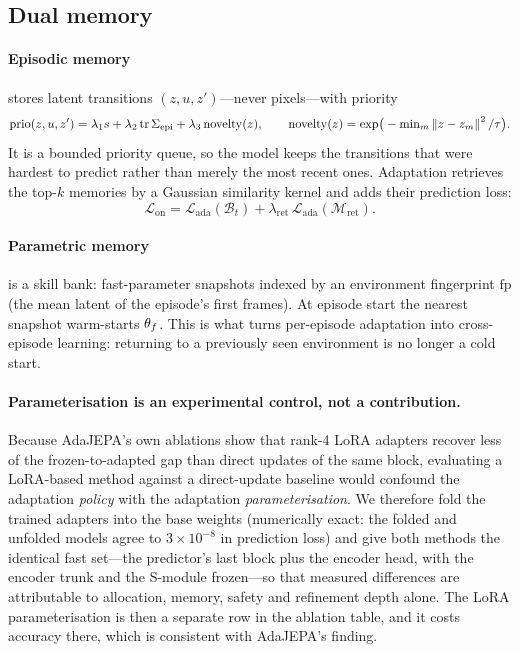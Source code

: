 \subsection{Dual memory}\label{sec:mem}

\paragraph{Episodic memory} stores latent transitions $(z,u,z')$---never pixels---with
priority
\begin{equation}
\mathrm{prio}(z,u,z') = \lambda_1 s + \lambda_2\,\mathrm{tr}\,\Sigma_{\mathrm{epi}}
+ \lambda_3\,\mathrm{novelty}(z),\qquad
\mathrm{novelty}(z)=\exp\!\big(-{\textstyle\min_m}\left\lVert z-z_m \right\rVert^2/\tau\big).
\end{equation}
It is a bounded priority queue, so the model keeps the transitions that were hardest to
predict rather than merely the most recent ones. Adaptation retrieves the top-$k$ memories by
a Gaussian similarity kernel and adds their prediction loss:
\begin{equation}
\mathcal L_{\mathrm{on}} = \mathcal L_{\mathrm{ada}}(\mathcal B_t)
+ \lambda_{\mathrm{ret}}\,\mathcal L_{\mathrm{ada}}(\mathcal M_{\mathrm{ret}}).
\end{equation}

\paragraph{Parametric memory} is a skill bank: fast-parameter snapshots indexed by an
environment fingerprint $\mathrm{fp}$ (the mean latent of the episode's first frames). At
episode start the nearest snapshot warm-starts $\theta_f$. This is what turns per-episode adaptation
into cross-episode learning: returning to a previously seen environment is no longer a
cold start.

\paragraph{Parameterisation is an experimental control, not a contribution.} Because
AdaJEPA's own ablations show that rank-4 LoRA adapters recover less of the frozen-to-adapted
gap than direct updates of the same block, evaluating a LoRA-based method against a
direct-update baseline would confound the adaptation \emph{policy} with the adaptation
\emph{parameterisation}. We therefore fold the trained adapters into the base weights
(numerically exact: the folded and unfolded models agree to $3\times10^{-8}$ in prediction
loss) and give both methods the identical fast set---the predictor's last block plus the
encoder head, with the encoder trunk and the S-module frozen---so that measured differences
are attributable to allocation, memory, safety and refinement depth alone. The LoRA
parameterisation is then a separate row in the ablation table, and it costs accuracy there,
which is consistent with AdaJEPA's finding.

